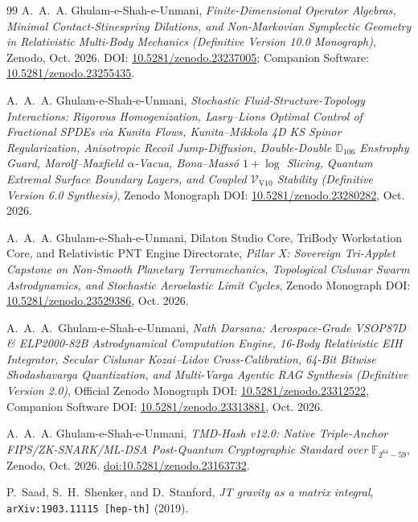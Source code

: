 \documentclass[11pt,a4paper,reqno]{article}
\theoremstyle{plain}
\theoremstyle{definition}
\theoremstyle{remark}
\numberwithin{equation}{section}
\begin{document}
\begin{thebibliography}{99}
A.~A.~A. Ghulam-e-Shah-e-Unmani,
\textit{Finite-Dimensional Operator Algebras, Minimal Contact-Stinespring Dilations, and Non-Markovian Symplectic Geometry in Relativistic Multi-Body Mechanics (Definitive Version 10.0 Monograph)},
Zenodo, Oct. 2026. DOI: \href{https://doi.org/10.5281/zenodo.23237005}{10.5281/zenodo.23237005}; Companion Software: \href{https://doi.org/10.5281/zenodo.23255435}{10.5281/zenodo.23255435}.

A.~A.~A. Ghulam-e-Shah-e-Unmani,
\textit{Stochastic Fluid-Structure-Topology Interactions: Rigorous Homogenization, Lasry--Lions Optimal Control of Fractional SPDEs via Kunita Flows, Kunita--Mikkola 4D KS Spinor Regularization, Anisotropic Recoil Jump-Diffusion, Double-Double $\mathbb{D}_{106}$ Enstrophy Guard, Marolf--Maxfield $\alpha$-Vacua, Bona--Mass\'o $1+\log$ Slicing, Quantum Extremal Surface Boundary Layers, and Coupled $\mathcal{V}_{\mathrm{V10}}$ Stability (Definitive Version 6.0 Synthesis)},
Zenodo Monograph DOI: \href{https://doi.org/10.5281/zenodo.23280282}{10.5281/zenodo.23280282}, Oct. 2026.

A.~A.~A. Ghulam-e-Shah-e-Unmani, {Dilaton Studio Core}, {TriBody Workstation Core}, and {Relativistic PNT Engine Directorate},
\textit{Pillar X: Sovereign Tri-Applet Capstone on Non-Smooth Planetary Terramechanics, Topological Cislunar Swarm Astrodynamics, and Stochastic Aeroelastic Limit Cycles},
Zenodo Monograph DOI: \href{https://doi.org/10.5281/zenodo.23529386}{10.5281/zenodo.23529386}, Oct. 2026.

A.~A.~A.~Ghulam-e-Shah-e-Unmani,
\textit{Nath Darsana: Aerospace-Grade VSOP87D \& ELP2000-82B Astrodynamical Computation Engine, 16-Body Relativistic EIH Integrator, Secular Cislunar Kozai--Lidov Cross-Calibration, 64-Bit Bitwise Shodashavarga Quantization, and Multi-Varga Agentic RAG Synthesis (Definitive Version 2.0)},
Official Zenodo Monograph DOI: \href{https://doi.org/10.5281/zenodo.23312522}{10.5281/zenodo.23312522},
Companion Software DOI: \href{https://doi.org/10.5281/zenodo.23313881}{10.5281/zenodo.23313881}, Oct. 2026.

A.~A.~A. Ghulam-e-Shah-e-Unmani,
\textit{TMD-Hash v12.0: Native Triple-Anchor FIPS/ZK-SNARK/ML-DSA Post-Quantum Cryptographic Standard over $\mathbb{F}_{2^{64}-59}$},
Zenodo, Oct. 2026. \href{https://doi.org/10.5281/zenodo.23163732}{doi:10.5281/zenodo.23163732}.

P.~Saad, S.~H.~Shenker, and D.~Stanford,
\textit{JT gravity as a matrix integral},
\texttt{arXiv:1903.11115 [hep-th]} (2019).


\end{thebibliography}
\end{document}
